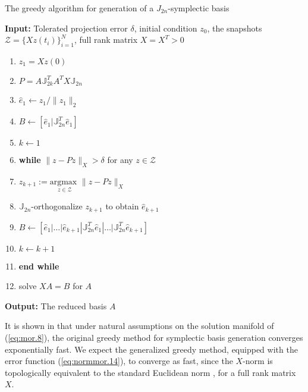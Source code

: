 \begin{algorithm} 
\caption{The greedy algorithm for generation of a $J_{2n}$-symplectic basis} \label{alg:2}
{\bf Input:} Tolerated projection error $\delta$, initial condition $ z_0$, the snapshots $\mathcal Z = \{Xz(t_i)\}_{i=1}^{N}$, full rank matrix $X=X^T>0$
\begin{enumerate}
\item $z_1 = Xz(0)$
\item $P = A \mathbb J_{2k}^T A^T X \mathbb J_{2n}$
\item $\hat e_1 \leftarrow z_1/ \| z_1 \|_2$
\item $B \leftarrow [\hat e_1| \mathbb J_{2n}^T \hat e_1]$
\item $k \leftarrow 1$
\item \textbf{while} $\| z - Pz\|_X > \delta$ for any $z \in \mathcal Z$
\item \hspace{0.5cm} $z_{k+1} := \underset{z\in \mathcal Z}{\text{argmax }} \| z - Pz \|_X$
\item \hspace{0.5cm} $\mathbb J_{2n}$-orthogonalize $z_{k+1}$ to obtain $\hat e_{k+1}$
\item \hspace{0.5cm} $B \leftarrow [\hat e_1|\dots |\hat e_{k+1} | \mathbb J_{2n}^T \hat e_1|\dots| \mathbb J_{2n}^T  \hat e_{k+1}]$
\item \hspace{0.5cm} $k \leftarrow k+1$
\item \textbf{end while}
\item solve $X A = B$ for $A$
\end{enumerate}
\vspace{0.5cm}
{\bf Output:} The reduced basis $A$
\end{algorithm}
It is shown in \cite{doi:10.1137/17M1111991} that under natural assumptions on the solution manifold of (\ref{eq:mor.8}), the original greedy method for symplectic basis generation converges exponentially fast. We expect the generalized greedy method, equipped with the error function (\ref{eq:normmor.14}), to converge as fast, since the $X$-norm is topologically equivalent to the standard Euclidean norm \cite{friedman1970foundations}, for a full rank matrix $X$.

